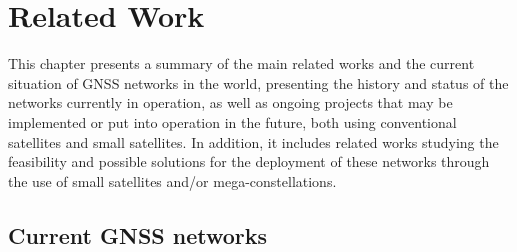 %
%
%
%
%

%
%
%
%
%


\chapter{Related Work} \label{ch:related-work}


This chapter presents a summary of the main related works and the current situation of GNSS networks in the world, presenting the history and status of the networks currently in operation, as well as ongoing projects that may be implemented or put into operation in the future, both using conventional satellites and small satellites. In addition, it includes related works studying the feasibility and possible solutions for the deployment of these networks through the use of small satellites and/or mega-constellations.

\section{Current GNSS networks}


